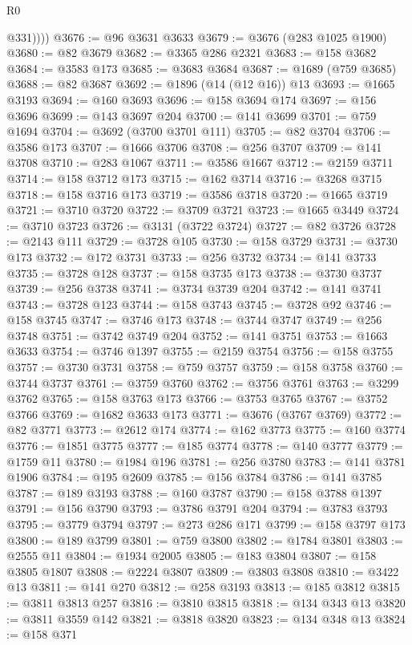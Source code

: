 \begin{lexlean}{R0}
\begin{coremodule}
            @331))))
@3676 := @96 @3631 @3633
@3679 := @3676 (@283 @1025 @1900)
@3680 := @82 @3679
@3682 := @3365 @286 @2321
@3683 := @158 @3682
@3684 := @3583 @173
@3685 := @3683 @3684
@3687 := @1689 (@759 @3685)
@3688 := @82 @3687
@3692 := @1896 (@14 (@12 @16)) @13
@3693 := @1665 @3193
@3694 := @160 @3693
@3696 := @158 @3694 @174
@3697 := @156 @3696
@3699 := @143 @3697 @204
@3700 := @141 @3699
@3701 := @759 @1694
@3704 := @3692 (@3700 @3701 @111)
@3705 := @82 @3704
@3706 := @3586 @173
@3707 := @1666 @3706
@3708 := @256 @3707
@3709 := @141 @3708
@3710 := @283 @1067
@3711 := @3586 @1667
@3712 := @2159 @3711
@3714 := @158 @3712 @173
@3715 := @162 @3714
@3716 := @3268 @3715
@3718 := @158 @3716 @173
@3719 := @3586 @3718
@3720 := @1665 @3719
@3721 := @3710 @3720
@3722 := @3709 @3721
@3723 := @1665 @3449
@3724 := @3710 @3723
@3726 := @3131 (@3722 @3724)
@3727 := @82 @3726
@3728 := @2143 @111
@3729 := @3728 @105
@3730 := @158 @3729
@3731 := @3730 @173
@3732 := @172 @3731
@3733 := @256 @3732
@3734 := @141 @3733
@3735 := @3728 @128
@3737 := @158 @3735 @173
@3738 := @3730 @3737
@3739 := @256 @3738
@3741 := @3734 @3739 @204
@3742 := @141 @3741
@3743 := @3728 @123
@3744 := @158 @3743
@3745 := @3728 @92
@3746 := @158 @3745
@3747 := @3746 @173
@3748 := @3744 @3747
@3749 := @256 @3748
@3751 := @3742 @3749 @204
@3752 := @141 @3751
@3753 := @1663 @3633
@3754 := @3746 @1397
@3755 := @2159 @3754
@3756 := @158 @3755
@3757 := @3730 @3731
@3758 := @759 @3757
@3759 := @158 @3758
@3760 := @3744 @3737
@3761 := @3759 @3760
@3762 := @3756 @3761
@3763 := @3299 @3762
@3765 := @158 @3763 @173
@3766 := @3753 @3765
@3767 := @3752 @3766
@3769 := @1682 @3633 @173
@3771 := @3676 (@3767 @3769)
@3772 := @82 @3771
@3773 := @2612 @174
@3774 := @162 @3773
@3775 := @160 @3774
@3776 := @1851 @3775
@3777 := @185 @3774
@3778 := @140 @3777
@3779 := @1759 @11
@3780 := @1984 @196
@3781 := @256 @3780
@3783 := @141 @3781 @1906
@3784 := @195 @2609
@3785 := @156 @3784
@3786 := @141 @3785
@3787 := @189 @3193
@3788 := @160 @3787
@3790 := @158 @3788 @1397
@3791 := @156 @3790
@3793 := @3786 @3791 @204
@3794 := @3783 @3793
@3795 := @3779 @3794
@3797 := @273 @286 @171
@3799 := @158 @3797 @173
@3800 := @189 @3799
@3801 := @759 @3800
@3802 := @1784 @3801
@3803 := @2555 @11
@3804 := @1934 @2005
@3805 := @183 @3804
@3807 := @158 @3805 @1807
@3808 := @2224 @3807
@3809 := @3803 @3808
@3810 := @3422 @13
@3811 := @141 @270
@3812 := @258 @3193
@3813 := @185 @3812
@3815 := @3811 @3813 @257
@3816 := @3810 @3815
@3818 := @134 @343 @13
@3820 := @3811 @3559 @142
@3821 := @3818 @3820
@3823 := @134 @348 @13
@3824 := @158 @371

\end{coremodule}
\end{lexlean}
